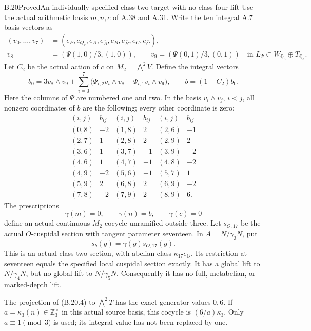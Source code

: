 \begin{statement}{B.20}{Proved}{An individually specified class-two target with no class-four lift}
Use the actual arithmetic basis $m,n,c$ of A.38 and
A.31. Write the ten integral A.7 basis vectors as
\[
 \begin{split}
 (v_0,\ldots,v_7)
   &=(e_P,e_{Q_c},e_A,e_{\bar A},e_B,e_{\bar B},e_C,e_{\bar C}),\\
 v_8&=(\Psi(1,0)/3,(1,0)),\qquad
 v_9=(\Psi(0,1)/3,(0,1))
       \quad\text{in }L_\Psi\subset W_{\mathbb Q_3}\oplus T_{\mathbb Q_3}.
 \end{split}                                                \tag{B.20.1}
\]
Let $C_2$ be the actual action of $c$ on
$M_2=\bigwedge^2V$. Define the integral vectors
\[
 b_0=3v_8\wedge v_9+
       \sum_{i=0}^7
       \bigl(\Psi_{i,2}v_i\wedge v_8
             -\Psi_{i,1}v_i\wedge v_9\bigr),
 \qquad b=(1-C_2)b_0.                                     \tag{B.20.2}
\]
Here the columns of $\Psi$ are numbered one and two.
In the basis $v_i\wedge v_j$, $i<j$, all nonzero
coordinates of $b$ are the following; every other
coordinate is zero:
\[
 \begin{array}{cr|cr|cr}
 (i,j)&b_{ij}&(i,j)&b_{ij}&(i,j)&b_{ij}\\\hline
 (0,8)&-2&(1,8)&2&(2,6)&-1\\
 (2,7)&1&(2,8)&2&(2,9)&2\\
 (3,6)&1&(3,7)&-1&(3,9)&-2\\
 (4,6)&1&(4,7)&-1&(4,8)&-2\\
 (4,9)&-2&(5,6)&-1&(5,7)&1\\
 (5,9)&2&(6,8)&2&(6,9)&-2\\
 (7,8)&-2&(7,9)&2&(8,9)&6.
 \end{array}                                                \tag{B.20.3}
\]
The prescriptions
\[
             \gamma(m)=0,\qquad \gamma(n)=b,
             \qquad \gamma(c)=0                           \tag{B.20.4}
\]
define an actual continuous $M_2$-cocycle unramified
outside three. Let $s_{O,17}$ be the actual $O$-cuspidal
section with tangent parameter seventeen. In
$A=N/\gamma_3N$, put
\[
                        s_b(g)=\gamma(g)s_{O,17}(g).
                                                               \tag{B.20.5}
\]
This is an actual class-two section, with abelian
class $\kappa_{17}e_O$. Its restriction at seventeen
equals the specified local cuspidal section exactly.
It has a global lift to $N/\gamma_4N$, but no global
lift to $N/\gamma_5N$. Consequently it has no full,
metabelian, or marked-depth lift.

The projection of (B.20.4) to $\bigwedge^2T$ has
the exact generator values $0,6$. If
$a=\kappa_3(n)\in\mathbb Z_3^\times$ in this actual
source basis, this cocycle is $(6/a)\kappa_3$.
Only $a\equiv1\pmod3$ is used; its integral value
has not been replaced by one.
\end{statement}
